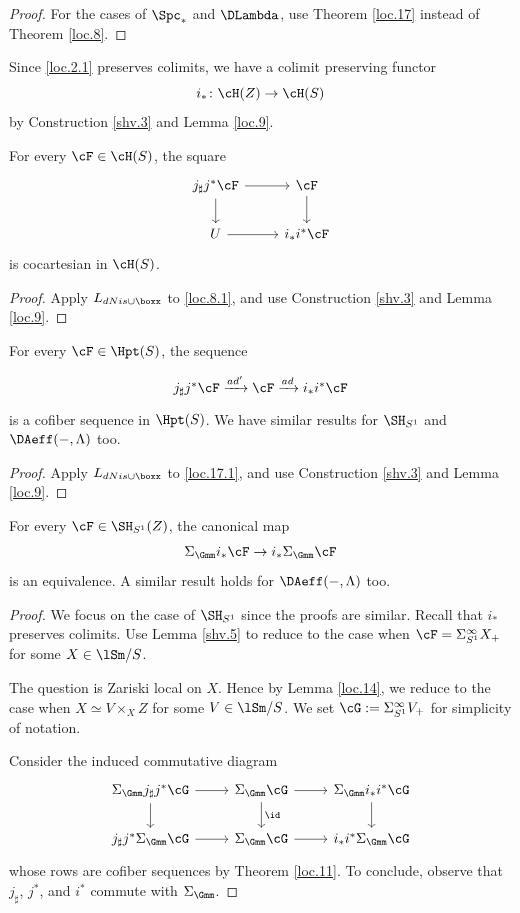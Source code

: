 \documentclass[10pt]{amsart}
\begin{document}
\begin{proof}
For the cases of $\Spc_*$ and $\DLambda$, use Theorem \ref{loc.17} instead of Theorem \ref{loc.8}.
\end{proof}

Since \eqref{loc.2.1} preserves colimits, we have a colimit preserving functor
\begin{equation}
\label{loc.9.3}
i_*\colon \cH(Z)\to \cH(S)
\end{equation}
by Construction \ref{shv.3} and Lemma \ref{loc.9}.

\begin{thm}
\label{loc.10}
For every  $\cF\in \cH(S)$, the square
\[
\begin{tikzcd}
j_\sharp j^*\cF\ar[d]\ar[r]&
\cF\ar[d]
\\
U\ar[r]&
i_*i^*\cF
\end{tikzcd}
\]
is cocartesian in $\cH(S)$.
\end{thm}
\begin{proof}
Apply $L_{dNis\cup\boxx}$ to \eqref{loc.8.1}, and use Construction \ref{shv.3} and Lemma \ref{loc.9}.
\end{proof}

\begin{thm}
\label{loc.11}
For every $\cF\in \Hpt(S)$, the sequence
\[
\begin{tikzcd}
j_\sharp j^* \cF
\xrightarrow{ad'}
\cF
\xrightarrow{ad}
i_*i^*\cF
\end{tikzcd}
\]
is a cofiber sequence in $\Hpt(S)$.
We have similar results for $\SH_{S^1}$ and $\DAeff(-,\Lambda)$ too.
\end{thm}
\begin{proof}
Apply $L_{dNis\cup\boxx}$ to \eqref{loc.17.1}, and use Construction \ref{shv.3} and Lemma \ref{loc.9}.
\end{proof}

\begin{lem}
\label{loc.18}
For every $\cF\in \SH_{S^1}(Z)$, the canonical map
\[
\Sigma_{\Gmm}i_*\cF
\to
i_*\Sigma_{\Gmm}\cF
\]
is an equivalence.
A similar result holds for $\DAeff(-,\Lambda)$ too.
\end{lem}
\begin{proof}
We focus on the case of $\SH_{S^1}$ since the proofs are similar.
Recall that $i_*$ preserves colimits.
Use Lemma \ref{shv.5} to reduce to the case when $\cF=\Sigma_{S^1}^\infty X_+$ for some $X\in \lSm/S$.

The question is Zariski local on $X$.
Hence by Lemma \ref{loc.14}, we reduce to the case when $X\simeq V\times_X Z$ for some $V\in \lSm/S$.
We set $\cG:=\Sigma_{S^1}^\infty V_+$ for simplicity of notation.

Consider the induced commutative diagram
\[
\begin{tikzcd}
\Sigma_{\Gmm}j_\sharp j^* \cG\ar[d]\ar[r]&
\Sigma_{\Gmm}\cG\ar[d,"\id"]\ar[r]&
\Sigma_{\Gmm}i_*i^*\cG\ar[d]
\\
j_\sharp j^* \Sigma_{\Gmm}\cG\ar[r]&
\Sigma_{\Gmm}\cG\ar[r]&
i_*i^*\Sigma_{\Gmm}\cG
\end{tikzcd}
\]
whose rows are cofiber sequences by Theorem \ref{loc.11}.
To conclude, observe that $j_\sharp$, $j^*$, and $i^*$ commute with $\Sigma_{\Gmm}$.
\end{proof}
\end{document}
